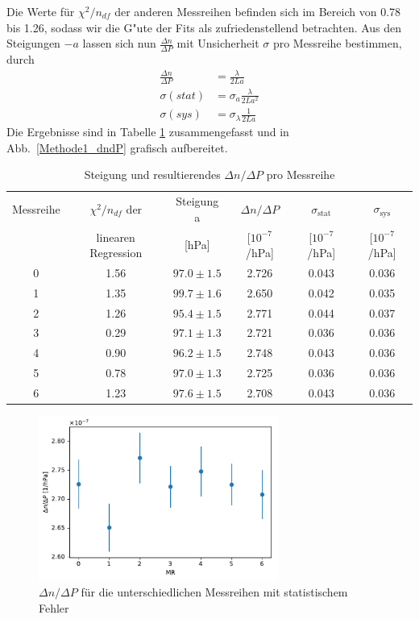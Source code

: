 \documentclass[12pt,a4paper]{article}
\begin{document}
Die Werte für $\chi^2/n_{df}$  der anderen Messreihen befinden sich im Bereich von 0.78 bis 1.26, sodass wir die G"ute der Fits als zufriedenstellend betrachten. Aus den Steigungen $-a$ lassen sich nun $\frac{\Delta n}{\Delta P}$ mit Unsicherheit $\sigma$ pro Messreihe bestimmen, durch
\begin{align}\label{eq:dndp_aus_Steigung}
\frac{\Delta n}{\Delta P}&=\frac{\lambda}{2La}\nonumber\\
\sigma(stat)&=\sigma_{a}\frac{\lambda}{2La^2}\nonumber\\
\sigma(sys)&=\sigma_{\lambda}\frac{1}{2La}
\end{align}
Die Ergebnisse sind in Tabelle \ref{table:Methode1_dndP} zusammengefasst und in Abb.~\eqref{Methode1_dndP} grafisch aufbereitet.
\begin{table}[H]
	\centering
	\begin{tabular}{|c|c|c|c|c|c|}
		\hline
		Messreihe&$\chi^2/n_{df}$ der&Steigung a &$\Delta n/\Delta P$&$\sigma_{\text{stat}}$&$\sigma_{\text{sys}}$\\
		&linearen Regression&[hPa]&[$10^{-7}$/hPa]&[$10^{-7}$/hPa]&[$10^{-7}$/hPa]\\
		\hline
		0&1.56&$97.0\pm1.5$&2.726&0.043&0.036\\
		1&1.35&$99.7\pm1.6$&2.650&0.042&0.035\\
		2&1.26&$95.4\pm1.5$&2.771&0.044&0.037\\
		3&0.29&$97.1\pm1.3$&2.721&0.036&0.036\\
		4&0.90&$96.2\pm1.5$&2.748&0.043&0.036\\
		5&0.78&$97.0\pm1.3$&2.725&0.036&0.036\\
		6&1.23&$97.6\pm1.5$&2.708&0.043&0.036\\
		\hline
	\end{tabular}
	\caption{Steigung und resultierendes $\Delta n/\Delta P$ pro Messreihe}
	\label{table:Methode1_dndP}
\end{table}

\begin{figure}[H]
	\centering
	\includegraphics[width=0.7\textwidth]{Python/Methode1_Ergebnisse.pdf}
	\caption{$\Delta n/\Delta P$ für die unterschiedlichen Messreihen mit statistischem Fehler}
	\label{Methode1_dndP}
\end{figure}
\end{document}
